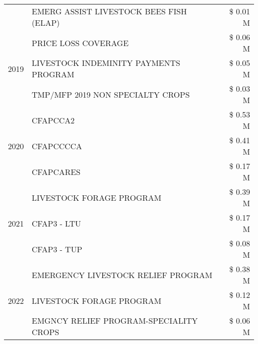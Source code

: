 \begin{tabular}{llr}
 & EMERG ASSIST LIVESTOCK BEES FISH (ELAP) & \$ 0.01 M \\
\cline{1-3}
\multirow[t]{3}{*}{2019} & PRICE LOSS COVERAGE & \$ 0.06 M \\
 & LIVESTOCK INDEMINITY PAYMENTS PROGRAM & \$ 0.05 M \\
 & TMP/MFP 2019 NON SPECIALTY CROPS & \$ 0.03 M \\
\cline{1-3}
\multirow[t]{3}{*}{2020} & CFAPCCA2 & \$ 0.53 M \\
 & CFAPCCCCA & \$ 0.41 M \\
 & CFAPCARES & \$ 0.17 M \\
\cline{1-3}
\multirow[t]{3}{*}{2021} & LIVESTOCK FORAGE PROGRAM & \$ 0.39 M \\
 & CFAP3 - LTU & \$ 0.17 M \\
 & CFAP3 - TUP & \$ 0.08 M \\
\cline{1-3}
\multirow[t]{3}{*}{2022} & EMERGENCY LIVESTOCK RELIEF PROGRAM & \$ 0.38 M \\
 & LIVESTOCK FORAGE PROGRAM & \$ 0.12 M \\
 & EMGNCY RELIEF PROGRAM-SPECIALITY CROPS & \$ 0.06 M \\
\cline{1-3}
\bottomrule
\end{tabular}
